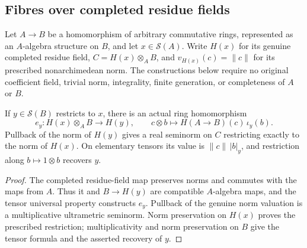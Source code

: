 \subsection{Fibres over completed residue fields}
\label{subsec:completed-residue-fibres}

Let $A\to B$ be a homomorphism of arbitrary commutative rings, represented
as an $A$-algebra structure on $B$, and let $x\in\mathcal S(A)$. Write
$H(x)$ for its genuine completed residue field, $C=H(x)\otimes_A B$, and
$v_{H(x)}(c)=\lVert c\rVert$ for its prescribed nonarchimedean norm.
The constructions below require no original coefficient field, trivial norm,
integrality, finite generation, or completeness of $A$ or $B$.

\begin{lemma}
\label{spectrum:fibre-tensor-evaluation}
\leanok
{}
If $y\in\mathcal S(B)$ restricts to $x$, there is an actual ring homomorphism
\[
 e_y:H(x)\otimes_A B\longrightarrow H(y),\qquad
 c\otimes b\longmapsto H(A\to B)(c)\,\iota_y(b).
\]
Pullback of the norm of $H(y)$ gives a real seminorm on $C$ restricting
exactly to the norm of $H(x)$. On elementary tensors its value is
$\lVert c\rVert\,|b|_y$, and restriction along $b\mapsto1\otimes b$
recovers $y$.
\end{lemma}
\begin{proof}
The completed residue-field map preserves norms and commutes with the
maps from $A$. Thus it and $B\to H(y)$ are compatible $A$-algebra maps,
and the tensor universal property constructs $e_y$.
Pullback of the genuine norm valuation is a multiplicative ultrametric
seminorm. Norm preservation on $H(x)$ proves the prescribed restriction;
multiplicativity and norm preservation on $B$ give the tensor formula and
the asserted recovery of $y$.
\end{proof}

